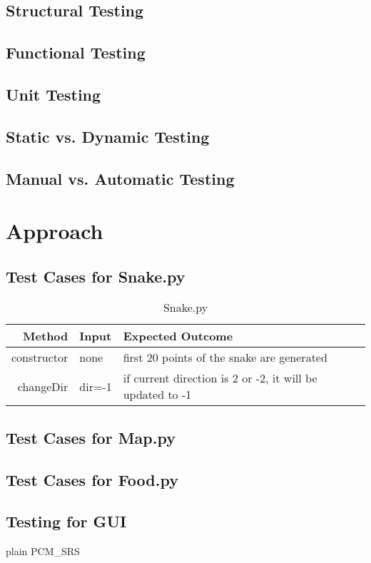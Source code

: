 \documentclass[12pt]{article}
\begin{document}
\subsection{Structural Testing}
\subsection{Functional Testing}
\subsection{Unit Testing}
\subsection{Static vs. Dynamic Testing}
\subsection{Manual vs. Automatic Testing}


\section{Approach}

\subsection{Test Cases for Snake.py}

\begin{center}
	\begin{longtable}{ | r | p{4cm} | p{4cm} | p{4cm} |}
	\caption{Snake.py} \\ \hline \label{TblInputVar} 
	Method & Input & Expected Outcome\\ \hline
	constructor & none &  first 20 points of the snake are generated\\ \hline
	changeDir & dir=-1 & if current direction is 2 or -2, it will be updated to -1\\ \hline
	\end{longtable}
\end{center}


\subsection{Test Cases for Map.py}
\subsection{Test Cases for Food.py}
\subsection{Testing for GUI}




 {plain}
 {PCM_SRS}
\end{document}
